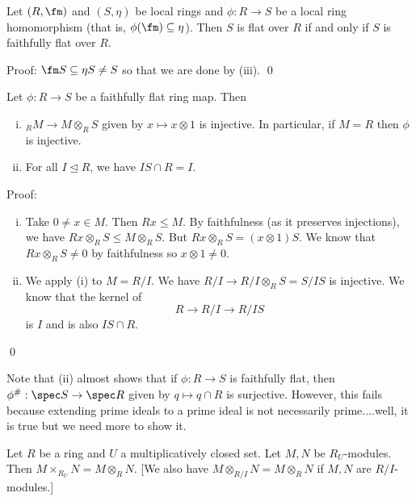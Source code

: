 \begin{cor}
Let $(R,\fm)$ and $(S,\eta)$ be local rings and $\phi: R \to S$ be a local ring homomorphism (that is, $\phi(\fm) \subseteq \eta$). Then $S$ is flat over $R$ if and only if $S$ is faithfully flat over $R$.
\end{cor}

\noindent Proof: $\fm S \subseteq \eta S \neq S$ so that we are done by (iii). \qed \\

\begin{prop}
Let $\phi: R \to S$ be a faithfully flat ring map. Then
\begin{enumerate}[(i)]
\item $_R M \to M \otimes_R S$ given by $x \mapsto x \otimes 1$ is injective. In particular, if $M=R$ then $\phi$ is injective. 
\item For all $I \unlhd R$, we have $IS \cap R=I$.
\end{enumerate}
\end{prop}

\noindent Proof: \\
\begin{enumerate}[(i)]
\item Take $0 \neq x \in M$. Then $Rx \leq M$. By faithfulness (as it preserves injections), we have $Rx \otimes_R S \leq M \otimes_R S$. But $Rx \otimes_R S=(x \otimes 1)S$. We know that $Rx \otimes_R S \neq 0$ by faithfulness so $x\otimes 1 \neq 0$. 
\item We apply (i) to $M=R/I$. We have $R/I \to R/I \otimes_R S=S/IS$ is injective. We know that the kernel of 
\[
R \to R/I \to R/IS
\]
is $I$ and is also $IS \cap R$. 
\end{enumerate}
\qed \\

\begin{rem}
Note that (ii) almost shows that if $\phi: R \to S$ is faithfully flat, then $\phi^\#: \spec S \to \spec R$ given by $q \mapsto q \cap R$ is surjective. However, this fails because extending prime ideals to a prime ideal is not necessarily prime....well, it is true but we need more to show it. 
\end{rem}

\begin{lem}
Let $R$ be a ring and $U$ a multiplicatively closed set. Let $M,N$ be $R_U$-modules. Then $M\times_{R_U} N =M \otimes_R N$. [We also have $M \otimes_{R/I} N=M\otimes_R N$ if $M,N$ are $R/I$-modules.]
\end{lem}

